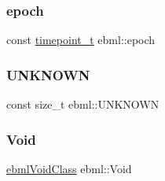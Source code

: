 \subsubsection{\texorpdfstring{epoch}{epoch}}
{\footnotesize\ttfamily const \mbox{\hyperlink{namespaceebml_a7e667ec3fe8b51fb5b8f9690734d8638}{timepoint\+\_\+t}} ebml\+::epoch}

\mbox{\label{namespaceebml_afdd26b7d8e8274b92f571969a325e52e}} 
\subsubsection{\texorpdfstring{U\+N\+K\+N\+O\+WN}{UNKNOWN}}
{\footnotesize\ttfamily const size\+\_\+t ebml\+::\+U\+N\+K\+N\+O\+WN}

\mbox{\label{namespaceebml_afbfd509d1cb71e416a07253746e886e9}} 
\subsubsection{\texorpdfstring{Void}{Void}}
{\footnotesize\ttfamily \mbox{\hyperlink{classebml_1_1ebmlVoidClass}{ebml\+Void\+Class}} ebml\+::\+Void}

